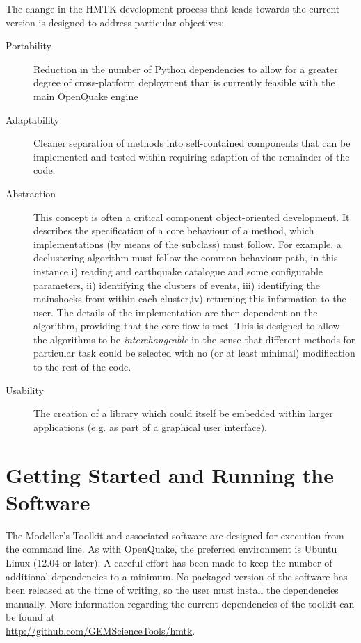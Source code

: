 The change in the HMTK development process that leads towards the current version is designed to address particular objectives:

\begin{description}
\item[Portability] Reduction in the number of Python dependencies to allow for a greater degree of cross-platform deployment than is currently feasible with the main OpenQuake engine

\item[Adaptability] Cleaner separation of methods into self-contained components that can be implemented and tested within requiring adaption of the remainder of the code.

\item[Abstraction] This concept is often a critical component object-oriented development. It describes the specification of a core behaviour of a method, which implementations (by means of the subclass) must follow. For example, a declustering algorithm must follow the common behaviour path, in this instance i) reading and earthquake catalogue and some configurable parameters, ii) identifying the clusters of events, iii) identifying the mainshocks from within each cluster,iv) returning this information to the user. The details of the implementation are then dependent on the algorithm, providing that the core flow is met. This is designed to allow the algorithms to be \emph{interchangeable} in the sense that different methods for  particular task could be selected with no (or at least minimal) modification to the rest of the code.

\item[Usability] The creation of a library which could itself be embedded within larger applications (e.g. as part of a graphical user interface).
 
\end{description}



\section{Getting Started and Running the Software}

The Modeller's Toolkit and associated software are designed for execution 
from the command line. As with OpenQuake, the preferred environment is 
Ubuntu Linux (12.04 or later). A careful effort has been made to keep 
the number of additional dependencies to a minimum. No packaged version of the software has been released at the time of writing, so the user must install the dependencies manually. More information regarding the current dependencies of the toolkit can be found at \hfill \\
\href{http://github.com/GEMScienceTools/hmtk}{http://github.com/GEMScienceTools/hmtk}. 

